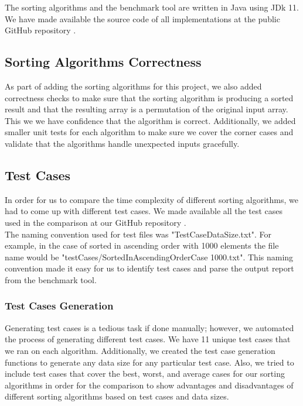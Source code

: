 The sorting algorithms and the benchmark tool are written in Java using JDk 11. We have made available the source code of all implementations at the public GitHub repository \cite{GitHubProjectURL}.

\subsection{Sorting Algorithms Correctness}
As part of adding the sorting algorithms for this project, we also added correctness checks to make sure that the sorting algorithm is producing a sorted result and that the resulting array is a permutation of the original input array. This we we have confidence that the algorithm is correct. Additionally, we added smaller unit tests for each algorithm to make sure we cover the corner cases and validate that the algorithms handle unexpected inputs gracefully.

\subsection{Test Cases}
In order for us to compare the time complexity of different sorting algorithms, we had to come up with different test cases. We made available all the test cases used in the comparison at our GitHub repository \cite{GitHubProjectURL}.\\
The naming convention used for test files was "TestCase\textunderscore DataSize.txt". For example, in the case of sorted in ascending order with 1000 elements the file name would be "testCases/SortedInAscendingOrderCase \textunderscore 1000.txt". This naming convention made it easy for us to identify test cases and parse the output report from the benchmark tool.

\subsubsection{Test Cases Generation}
Generating test cases is a tedious task if done manually; however, we automated the process of generating different test cases. We have 11 unique test cases that we ran on each algorithm. Additionally, we created the test case generation functions to generate any data size for any particular test case. Also, we tried to include test cases that cover the best, worst, and average cases for our sorting algorithms in order for the comparison to show advantages and disadvantages of different sorting algorithms based on test cases and data sizes.

